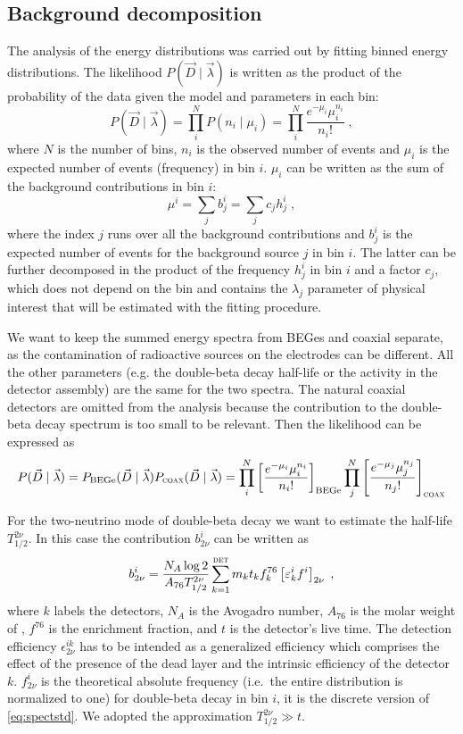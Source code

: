 \subsection*{Background decomposition}
The analysis of the energy distributions was carried out by fitting binned energy distributions. The likelihood $P(\vec{D}\mid\vec{\lambda})$ is written as the product of the probability of the data given the model and parameters in each bin:
\[P(\vec{D}\mid\vec{\lambda})=\prod_i^{N}P(n_i\mid\mu_i)=\prod_i^N\frac{e^{-\mu_i}\mu_i^{n_i}}{n_i!}\;,\]
where $N$ is the number of bins, $n_i$ is the observed number of events and $\mu_i$ is the expected number of events (frequency) in bin $i$. $\mu_i$ can be written as the sum of the background contributions in bin $i$:
\[\mu^i=\sum_jb_j^i=\sum_j c_jh_j^i\;,\]
where the index $j$ runs over all the background contributions and $b_j^i$ is the expected number of events for the background source $j$ in bin $i$. The latter can be further decomposed in the product of the frequency $h_j^i$ in bin $i$ and a factor $c_j$, which does not depend on the bin and contains the $\lambda_j$ parameter of physical interest that will be estimated with the fitting procedure.

We want to keep the summed energy spectra from BEGes and coaxial separate, as the contamination of radioactive sources on the electrodes can be different. All the other parameters (e.g. the double-beta decay half-life or the  activity in the detector assembly) are the same for the two spectra. The natural coaxial detectors are omitted from the analysis because the contribution to the double-beta decay spectrum is too small to be relevant. Then the likelihood can be expressed as
\[P(\vec{D}\mid\vec{\lambda})=P_\text{BEGe}(\vec{D}\mid\vec{\lambda})P_\textsc{coax}(\vec{D}\mid\vec{\lambda})=\prod_i^N\left[\frac{e^{-\mu_i}\mu_i^{n_i}}{n_i!}\right]_\text{BEGe}\prod_j^N\left[\frac{e^{-\mu_j}\mu_j^{n_j}}{n_j!}\right]_\textsc{coax}\]

\marginnote{$2\nbb$} For the two-neutrino mode of double-beta decay we want to estimate the half-life $T_{1/2}^{2\nu}$. In this case the contribution $b_{2\nu}^i$ can be written as
\[b_{2\nu}^i=\frac{N_A\log2}{A_{76}T_{1/2}^{2\nu}}\sum_{k=1}^\textsc{det}m_kt_kf^{76}_k\left[\epsilon^i_kf^i\right]_{2\nu}\;,\]
where $k$ labels the detectors, $N_A$ is the Avogadro number, $A_{76}$ is the molar weight of , $f^{76}$ is the enrichment fraction, and $t$ is the detector's live time. The detection efficiency $\epsilon_{2\nu}^{ik}$ has to be intended as a generalized efficiency which comprises the effect of the presence of the dead layer and the intrinsic efficiency of the detector $k$. $f_{2\nu}^i$ is the theoretical absolute frequency (i.e.~the entire distribution is normalized to one) for double-beta decay in bin $i$, it is the discrete version of \ref{eq:spectstd}. We adopted the approximation $T_{1/2}^{2\nu}\gg t$.

